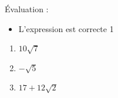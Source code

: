 %
%
    Évaluation :
    \begin{itemize}
        \item L'expression est correcte \hfill 1
    \end{itemize}
    \begin{enumerate}[cols=3]
        \item $10 \sqrt{7}$
        \item $-\sqrt{5}$
        \item $17+12\sqrt{2}$
    \end{enumerate}
